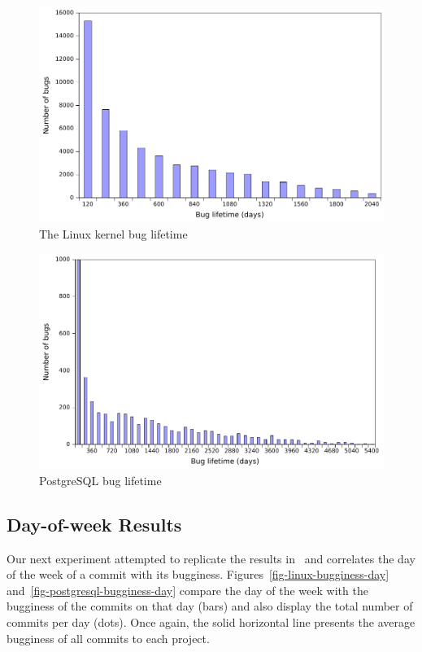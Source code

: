\begin{figure}
\begin{center}
\includegraphics[width=\columnwidth]{linux-bug-lifetime.pdf}
\end{center}
\caption{The Linux kernel bug lifetime}
\label{fig-linux-bug-lifetime}
\end{figure}

\begin{figure}
\begin{center}
\includegraphics[width=\columnwidth]{postgresql-bug-lifetime.pdf}
\end{center}
\caption{PostgreSQL bug lifetime}
\label{fig-postgresql-bug-lifetime}
\end{figure}


\subsection{Day-of-week Results}
Our next experiment attempted to replicate the results
in~\cite{sliwerski-msr-2005} and correlates the day of the week
of a commit with its bugginess. Figures~\ref{fig-linux-bugginess-day} 
and~\ref{fig-postgresql-bugginess-day} compare the day of the week
with the bugginess of the commits on that day (bars) and also display
the total number of commits per day (dots). Once again, the solid
horizontal line presents the average bugginess of all commits to
each project.

